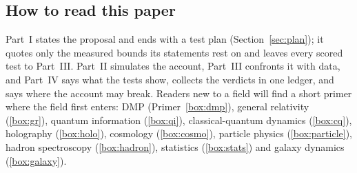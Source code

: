 \documentclass[11pt,a4paper]{article}
\begin{document}
\subsection{How to read this paper}\label{sec:howto}

Part~I states the proposal and ends with a test plan (Section~\ref{sec:plan}); it quotes only the measured bounds its statements rest on and leaves every
scored test to Part~III. Part~II simulates the account,
Part~III confronts it with data, and Part~IV says what the tests show, collects the verdicts in one ledger, and says where the account
may break. Readers new to a field will find a short primer where the field first enters: DMP (Primer~\ref{box:dmp}), general relativity
(\ref{box:gr}), quantum information (\ref{box:qi}), classical-quantum dynamics (\ref{box:cq}), holography (\ref{box:holo}), cosmology
(\ref{box:cosmo}), particle physics (\ref{box:particle}), hadron spectroscopy (\ref{box:hadron}), statistics (\ref{box:stats}) and galaxy
dynamics (\ref{box:galaxy}).
\end{document}
